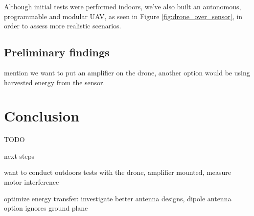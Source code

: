 \documentclass[conference]{IEEEtran}
\begin{document}
Although initial tests were performed indoors, we've also built an autonomous, programmable and modular UAV, as seen in Figure \ref{fig:drone_over_sensor}, in order to assess more realistic scenarios.

\subsection{Preliminary findings}

mention we want to put an amplifier on the drone, another option would be using harvested energy from the sensor.

\section{Conclusion}

TODO

next steps

want to conduct outdoors tests with the drone, amplifier mounted, measure motor interference

optimize energy transfer: investigate better antenna designs, dipole antenna option ignores ground plane



\end{document}
